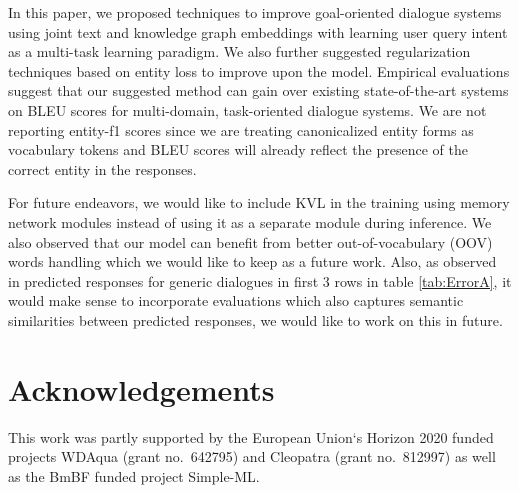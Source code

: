 \documentclass[runningheads]{llncs}
\begin{document}
In this paper, we proposed techniques to improve goal-oriented dialogue systems using joint text and knowledge graph embeddings with learning user query intent as a multi-task learning paradigm. We also further suggested regularization techniques based on entity loss to improve upon the model. Empirical evaluations suggest that our suggested method can gain over existing state-of-the-art systems on BLEU scores for multi-domain, task-oriented dialogue systems. We are not reporting entity-f1 scores since we are treating canonicalized entity forms as vocabulary tokens and BLEU scores will already reflect the presence of the correct entity in the responses.

For future endeavors, we would like to include KVL in the training using memory network modules instead of using it as a separate module during inference. We also observed that our model can benefit from better out-of-vocabulary (OOV) words handling which we would like to keep as a future work. Also, as observed in predicted responses for generic dialogues in first 3 rows in table \ref{tab:ErrorA}, it would make sense to incorporate evaluations which also captures semantic similarities between predicted responses, we would like to work on this in future. 

\section{Acknowledgements}

This work was partly supported by the European Union`s Horizon 2020 funded projects WDAqua (grant no.~642795) and Cleopatra (grant no.~812997) as well as the BmBF funded project Simple-ML.














\end{document}
